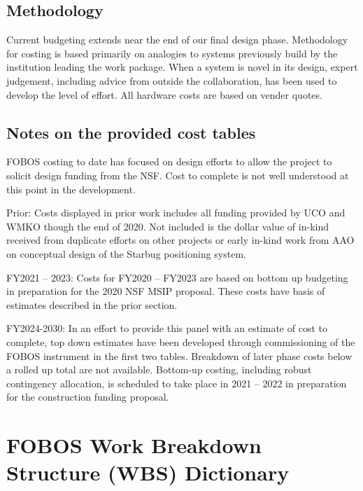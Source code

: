 \documentclass[oneside,11pt]{amsart}
\begin{document}
\subsection{Methodology}

Current budgeting extends near the end of our final design phase.
Methodology for costing is based primarily on analogies to systems
previously build by the institution leading the work package. When a
system is novel in its design, expert judgement, including advice
from outside the collaboration, has been used to develop the level of
effort. All hardware costs are based on vender quotes.

\subsection{Notes on the provided cost tables}

FOBOS costing to date has focused on design efforts to allow the
project to solicit design funding from the NSF. Cost to complete is
not well understood at this point in the development.

\noindent Prior: Costs displayed in prior work includes all funding
provided by UCO and WMKO though the end of 2020. Not included is the
dollar value of in-kind received from duplicate efforts on other
projects or early in-kind work from AAO on conceptual design of the
Starbug positioning system.

\noindent FY2021 – 2023: Costs for FY2020 – FY2023 are based on
bottom up budgeting in preparation for the 2020 NSF MSIP proposal.
These costs have basis of estimates described in the prior section.

\noindent FY2024-2030: In an effort to provide this panel with an
estimate of cost to complete, top down estimates have been developed
through commissioning of the FOBOS instrument in the first two
tables. Breakdown of later phase costs below a rolled up total are
not available. Bottom-up costing, including robust contingency
allocation, is scheduled to take place in 2021 – 2022 in preparation
for the construction funding proposal.


\begin{multicols}{2}
\scriptsize


\end{multicols}

\newpage

\setcounter{page}{1}
\section*{FOBOS Work Breakdown Structure (WBS) Dictionary}
\end{document}

